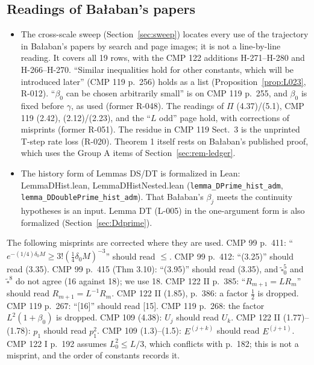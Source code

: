 \subsection{Readings of Ba{\l}aban's papers}\label{sec:rem-verif}
\begin{itemize}
\item[10.] The cross-scale sweep (Section~\ref{sec:sweep}) locates every use of the trajectory in Ba{\l}aban's papers by search and page images; it is not a line-by-line reading. It covers all 19 rows, with the CMP 122 additions H-271--H-280 and H-266--H-270. ``Similar inequalities hold for other constants, which will be introduced later'' (CMP 119 p.\ 256) holds as a list (Proposition~\ref{prop:L023}, R-012). ``$\beta_0$ can be chosen arbitrarily small'' is on CMP 119 p.\ 255, and $\beta_0$ is fixed before $\gamma$, as used (former R-048). The readings of $\Pi$ (4.37)/(5.1), CMP 119 (2.42), (2.12)/(2.23), and the ``$L$ odd'' page hold, with corrections of misprints (former R-051). The residue in CMP 119 Sect.\ 3 is the unprinted T-step rate loss (R-020). Theorem 1 itself rests on Ba{\l}aban's published proof, which uses the Group A items of Section~\ref{sec:rem-ledger}.
\item[13.] The history form of Lemmas DS/DT is formalized in Lean: LemmaDHist.lean, LemmaDHistNested.lean (\texttt{lemma\_DPrime\_hist\_adm}, \texttt{lemma\_DDoublePrime\_hist\_adm}). That Ba{\l}aban's $\beta_j$ meets the continuity hypotheses is an input. Lemma DT (L-005) in the one-argument form is also formalized (Section~\ref{sec:Ddprime}).
\end{itemize}

\begin{remark}\label{rem:misprints}
The following misprints are corrected where they are used. CMP 99 p.~411: ``$e^{-(1/4)\delta_0M}\ge3!(\tfrac14\delta_0M)^{-3}$'' should read $\le$. CMP 99 p.~412: ``(3.25)'' should read (3.35). CMP 99 p.~415 (Thm 3.10): ``(3.95)'' should read (3.35), and $\tilde\square_0^5$ and $\tilde\square^8$ do not agree (16 against 18); we use 18. CMP 122 II p.~385: ``$R_{m+1}=LR_m$'' should read $R_{m+1}=L^{-1}R_m$. CMP 122 II (1.85), p.~386: a factor $\tfrac12$ is dropped. CMP 119 p.~267: ``[16]'' should read [15]. CMP 119 p.~268: the factor $L^2(1+\beta_0)$ is dropped. CMP 109 (4.38): $U_j$ should read $U_k$. CMP 122 II (1.77)--(1.78): $p_1$ should read $p_1^2$. CMP 109 (1.3)--(1.5): $E^{(j+k)}$ should read $E^{(j+1)}$. CMP 122 I p.~192 assumes $L_0^2\le L/3$, which conflicts with p.~182; this is not a misprint, and the order of constants records it.
\end{remark}

